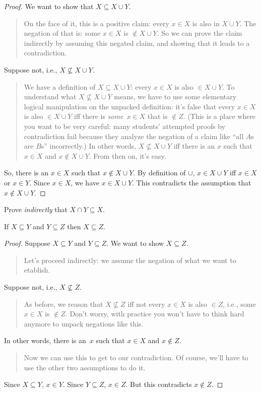 \documentclass[../../../include/open-logic-section]{subfiles}
\begin{document}
\begin{proof}
  We want to show that $X \subseteq X \cup Y$.
  \begin{quote}
    On the face of it, this is a positive claim: every $x \in X$ is
    also in $X \cup Y$.  The negation of that is: some $x \in X$ is
    $\notin X \cup Y$. So we can prove the claim indirectly by
    assuming this negated claim, and showing that it leads to a
    contradiction.
    \end{quote}
  Suppose not, i.e., $X \nsubseteq X \cup Y$.
  \begin{quote}
    We have a definition of $X \subseteq X \cup Y$: every $x \in X$ is
    also $\in X \cup Y$.  To understand what $X \nsubseteq X \cup Y$
    means, we have to use some elementary logical manipulation on the
    unpacked definition: it's false that every $x \in X$ is also $\in
    X \cup Y$ iff there is \emph{some}~$x \in X$ that is $\notin Z$.
    (This is a place where you want to be very careful: many students'
    attempted proofs by contradiction fail because they analyze the
    negation of a claim like ``all $A$s are $B$s'' incorrectly.) In
    other words, $X \nsubseteq X \cup Y$ iff there is an $x$ such that
    $x \in X$ and $x \notin X \cup Y$. From then on, it's easy.
  \end{quote}
  So, there is an $x \in X$ such that $x \notin X \cup Y$.  By
  definition of $\cup$, $x \in X \cup Y$ iff $x \in X$ or $x \in
  Y$. Since $x \in X$, we have $x \in X \cup Y$. This contradicts the
  assumption that $x \notin X \cup Y$. 
\end{proof}

\begin{prob}
Prove \emph{indirectly} that $X \cap Y \subseteq X$.
\end{prob}

\begin{prop}
If $X \subseteq Y$ and $Y \subseteq Z$ then $X \subseteq Z$.
\end{prop}

\begin{proof}
  Suppose $X \subseteq Y$ and $Y \subseteq Z$. We want to show $X
  \subseteq Z$.
  \begin{quote}
    Let's proceed indirectly: we assume the negation of what we want
    to etablish.
  \end{quote}
  Suppose not, i.e., $X \nsubseteq Z$.
  \begin{quote}
    As before, we reason that $X \nsubseteq Z$ iff not every $x \in X$
    is also $\in Z$, i.e., some $x \in X$ is $\notin Z$.  Don't worry,
    with practice you won't have to think hard anymore to unpack
    negations like this.
  \end{quote}
  In other words, there is an~$x$ such that $x \in X$ and $x \notin Z$.
  \begin{quote}
    Now we can use this to get to our contradiction. Of course, we'll
    have to use the other two assumptions to do it.
  \end{quote}
  Since $X \subseteq Y$, $x \in Y$. Since $Y \subseteq Z$, $x \in
  Z$. But this contradicts $x \notin Z$.
\end{proof}
\end{document}
